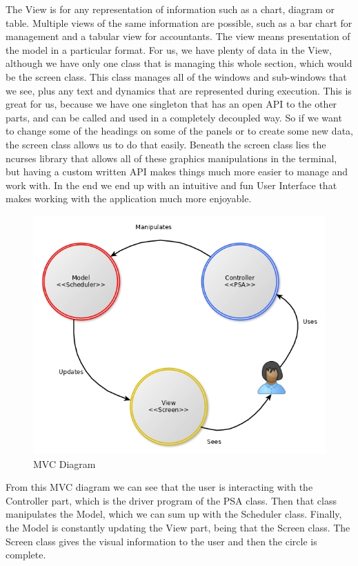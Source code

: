 \documentclass{article}
\begin{document}
The View is for any representation of information such as a chart, diagram or table. Multiple views of the same information are possible, such as a bar chart for management and a tabular view for accountants. The view means presentation of the model in a particular format. For us, we have plenty of data in the View, although we have only one class that is managing this whole section, which would be the screen class. This class manages all of the windows and sub-windows that we see, plus any text and dynamics that are represented during execution. This is great for us, because we have one singleton that has an open API to the other parts, and can be called and used in a completely decoupled way. So if we want to change some of the headings on some of the panels or to create some new data, the screen class allows us to do that easily. Beneath the screen class lies the ncurses library that allows all of these graphics manipulations in the terminal, but having a custom written API makes things much more easier to manage and work with. In the end we end up with an intuitive and fun User Interface that makes working with the application much more enjoyable.

\begin{figure}[H]
  \centering
  \includegraphics[width=\linewidth]{./pics/mvc.jpg}
  \caption{MVC Diagram}
  \label{fig:MVC Diagram}
\end{figure}

From this MVC diagram we can see that the user is interacting with the Controller part, which is the driver program of the PSA class. Then that class manipulates the Model, which we can sum up with the Scheduler class. Finally, the Model is constantly updating the View part, being that the Screen class. The Screen class gives the visual information to the user and then the circle is complete.
\end{document}
